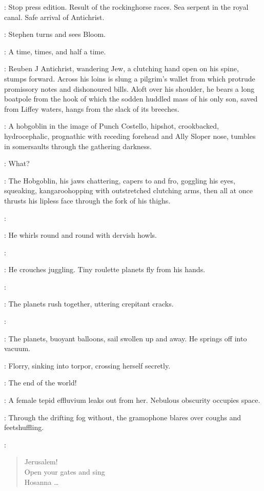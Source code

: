 \Newsboys:
Stop press edition.
Result of the rockinghorse races.
Sea serpent in the royal canal.
Safe arrival of Antichrist.

:
Stephen turns and sees Bloom.

\Stephen:
A time, times, and half a time.

:
Reuben J Antichrist, wandering Jew,
a clutching hand open on his spine, stumps forward.
Across his loins is slung a pilgrim's wallet from which
protrude promissory notes and dishonoured bills.
Aloft over his shoulder, he bears a long boatpole
from the hook of which the sodden huddled mass of his only son,
saved from Liffey waters, hangs from the slack of its breeches.

:
A hobgoblin in the image of Punch Costello, hipshot, crookbacked,
hydrocephalic, prognathic with receding forehead and Ally Sloper nose,
tumbles in somersaults through the gathering darkness.

\All:
What?

:
The Hobgoblin, his jaws chattering, capers to and fro, goggling his eyes,
squeaking, kangaroohopping with outstretched clutching arms,
then all at once thrusts his lipless face through the fork of his thighs.

\Hobgoblin:

:
He whirls round and round with dervish howls.

\Hobgoblin:

:
He crouches juggling.
Tiny roulette planets fly from his hands.

\Hobgoblin:

:
The planets rush together, uttering crepitant cracks.

\Hobgoblin:

:
The planets, buoyant balloons, sail swollen up and away.
He springs off into vacuum.

:
Florry, sinking into torpor, crossing herself secretly.

\Florry:
The end of the world!

:
A female tepid effluvium leaks out from her.
Nebulous obscurity occupies space.

:
Through the drifting fog without, the gramophone blares over coughs and feetshuffling.

\Gramophone:
\begin{verse}
    Jerusalem!\\
    Open your gates and sing\\
    Hosanna \ldots
\end{verse}

